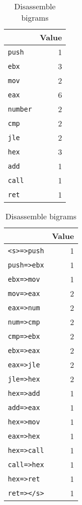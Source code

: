 \begin{table}[!htb]
	\begin{minipage}{.5\linewidth}
		\centering
		
		\caption{Disassemble unigrams}
		\label{tab:dis_uni}
		
		\medskip
		
		\begin{tabular}{  lr } 
			\toprule
			\makecell{ Feature }  &  Value \\   
			
			\midrule 
			\texttt{push} & 1	\\
			\texttt{ebx} & 3\\
			\texttt{mov} & 2\\
			\texttt{eax} & 6\\
			\texttt{number} & 2\\
			\texttt{cmp} & 2\\
			\texttt{jle} & 2\\
			\texttt{hex} & 3\\
			\texttt{add} & 1\\
			\texttt{call} & 1\\
			\texttt{ret} & 1\\
			\bottomrule
		\end{tabular}
	\end{minipage}\hfill
	\begin{minipage}{.5\linewidth}
		\centering
		
		\caption{Disassemble bigrams}
		\label{tab:dis_big}
		
		\medskip
		
		\begin{tabular}{  lr } 
			\toprule
			\makecell{ Feature }  &  Value \\   
			
			\midrule 
			\texttt{<s>=>push} & 1	\\
			\texttt{push=>ebx} & 1\\
			\texttt{ebx=>mov} & 1\\
			\texttt{mov=>eax} & 2\\
			\texttt{eax=>num} & 2\\
			\texttt{num=>cmp} & 2\\
			\texttt{cmp=>ebx} & 2\\
			\texttt{ebx=>eax} & 2\\
			\texttt{eax=>jle} & 2\\
			\texttt{jle=>hex} & 2\\
			\texttt{hex=>add} & 1\\
			\texttt{add=>eax} & 1\\
			\texttt{hex=>mov} & 1\\
			\texttt{eax=>hex} & 1\\
			\texttt{hex=>call} & 1\\
			\texttt{call=>hex} & 1\\
			\texttt{hex=>ret} & 1\\
			\texttt{ret=></s>} & 1\\
			\bottomrule
		\end{tabular}
	\end{minipage}
\end{table}


